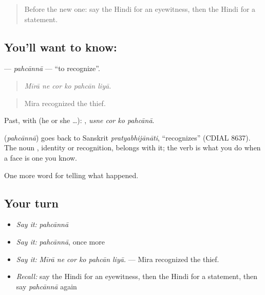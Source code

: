 \label{lesson:HI-C291-pahcanna}



\begin{quote}
Before the new one: say the Hindi for an eyewitness, then the Hindi for a statement.
\end{quote}

\subsection*{You'll want to know: }
\textbf{} — \emph{pahcānnā} — \textquotedblleft{}to recognize\textquotedblright{}.

\begin{quote}
     
\end{quote}

\begin{quote}
\emph{Mīrā ne cor ko pahcān liyā.}
\end{quote}

\begin{quote}
Mira recognized the thief.
\end{quote}

Past, with  (he or she …):    , \emph{usne cor ko pahcānā}.

\begin{cousinweb}
\textbf{} (\emph{pahcānnā}) goes back to Sanskrit \emph{pratyabhijānāti}, \textquotedblleft{}recognizes\textquotedblright{} (CDIAL 8637). The noun \textbf{}, identity or recognition, belongs with it; the verb is what you do when a face is one you know.
\end{cousinweb}

\begin{grammarlens}[title={What you've built}]
One more word for telling what happened.
\end{grammarlens}

\subsection*{Your turn}
\begin{itemize}
\raggedright
  \item \emph{Say it:} \emph{pahcānnā}
  \item \emph{Say it:} \emph{pahcānnā}, once more
  \item \emph{Say it:} \emph{Mīrā ne cor ko pahcān liyā.} — Mira recognized the thief.
  \item \emph{Recall:} say the Hindi for an eyewitness, then the Hindi for a statement, then say \emph{pahcānnā} again
\end{itemize}

